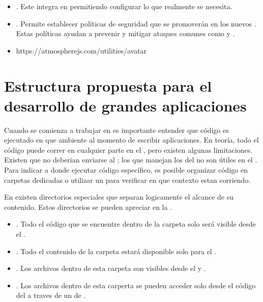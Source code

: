 \begin{itemize}
		\item
			\textbf{\bootstrapPackage}. Este \packageAS integra \bootstrapNAME en \meteorNAME permitiendo configurar lo que realmente se necesita.
		\item
			\textbf{\browserPolicyPackage}. Permite establecer políticas de seguridad que se promoverán en los nuevos \browsersINT. Estas políticas ayudan a prevenir y mitigar ataques comunes como \crossSiteScriptingINT y \clickjackingINT.
		\item
			https://atmospherejs.com/utilities/avatar
	\end{itemize}


\section{Estructura propuesta para el desarrollo de grandes aplicaciones}\label{cap:arquitectura:section:generic_architecture_structure}

Cuando se comienza a trabajar en \meteorNAME es importante entender que código es ejecutado en que ambiente al momento de escribir aplicaciones. En teoría, todo el código puede correr en cualquier parte en el \stackAS, pero existen algunas limitaciones. Existen \apikeyAS que no deberian enviarse al \clientAS; los \events que manejan los \clicksPC del \mousePC no son útiles en el \serverAS. Para indicar a \meteorNAME donde ejecutar código específico, es posible organizar código en carpetas dedicadas o utilizar un \checkCPT para verificar en que contexto estan corriendo.

En \meteorNAME existen directorios especiales que separan logicamente el alcance de su contenido. Estos directorios se pueden apreciar en la .


	\begin{itemize}
		\item
			\textbf{\clientFolder}. Todo el código que se encuentre dentro de la carpeta  \clientFolder solo será visible desde el \clientSideAS.
		\item
			\textbf{\serverFolder}.  Todo el contenido de la carpeta \serverFolder estará disponible solo para el \serverSideAS.
		\item
			\textbf{\publicFolder}. Los archivos dentro de esta carpeta son visibles desde el \clientSideAS y \serverSideAS.
		\item
			\textbf{\privateFolder}. Los archivos dentro de esta carperta se pueden acceder solo desde el código del \serverAS a traves de un \apiAS de \assetsAS.
	\end{itemize}

